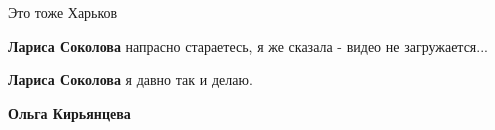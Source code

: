 \begin{itemize}
\begin{itemize}
\begin{itemize}
Это тоже Харьков

\textbf{Лариса Соколова} напрасно стараетесь, я же сказала - видео не загружается...

\textbf{Лариса Соколова} я давно так и делаю.

\textbf{Ольга Кирьянцева}



\end{itemize} %

\end{itemize} %

\end{itemize} %

